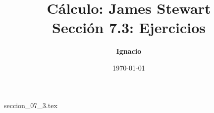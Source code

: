 \documentclass[11pt,spanish,oneside]{report}
\title{\textbf{Cálculo: James Stewart} \\ \Large Sección 7.3: Ejercicios}
\author{\textbf{Ignacio}}
\date{\today}
\begin{document}
\maketitle

{seccion_07_3.tex}
\end{document}
